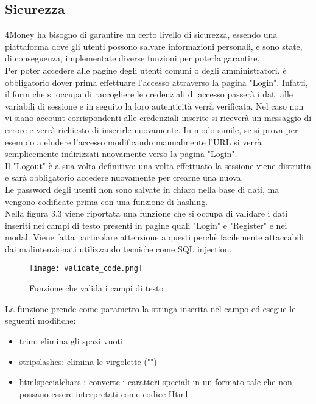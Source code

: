 \documentclass[binding=0.6cm, oneside, noexaminfo, italian]{sapthesis}
\begin{document}
\subsection{Sicurezza}
4Money ha bisogno di garantire un certo livello di sicurezza, essendo una piattaforma dove gli utenti possono salvare informazioni personali, e sono state, di conseguenza, implementate diverse funzioni per poterla garantire. \\
Per poter accedere alle pagine degli utenti comuni o degli amministratori, è obbligatorio dover prima effettuare l'accesso attraverso la pagina "Login". Infatti, il form che si occupa di raccogliere le credenziali di accesso passerà i dati alle variabili di sessione e in seguito la loro autenticità verrà verificata. Nel caso non vi siano account corrispondenti alle credenziali inserite si riceverà un messaggio di errore e verrà richiesto di inserirle nuovamente. In modo simile, se si prova per esempio a eludere l'accesso modificando manualmente l'URL si verrà semplicemente indirizzati nuovamente verso la pagina "Login". \\
Il "Logout" è a sua volta definitivo: una volta effettuato la sessione viene distrutta e sarà obbligatorio accedere nuovamente per crearne una nuova. \\
Le password degli utenti non sono salvate in chiaro nella base di dati, ma vengono codificate prima con una funzione di hashing. \\
Nella figura 3.3 viene riportata una funzione che si occupa di validare i dati inseriti nei campi di testo presenti in pagine quali "Login" e "Register" e nei modal. Viene fatta particolare attenzione a questi perchè facilemente attaccabili dai malintenzionati utilizzando tecniche come SQL injection.
\newpage
\begin{figure}[h]
    \centering
    \texttt{[image: validate\_code.png]}
    \caption{Funzione che valida i campi di testo}
    \label{fig:validate_code}
\end{figure} 
La funzione prende come parametro la stringa inserita nel campo ed esegue le seguenti modifiche:
\begin{itemize}
    \item trim: elimina gli spazi vuoti
    \item stripslashes: elimina le virgolette ("")
    \item htmlspecialchars : converte i caratteri speciali in un formato tale che non possano essere interpretati come codice Html
\end{itemize}
\newpage
\end{document}
